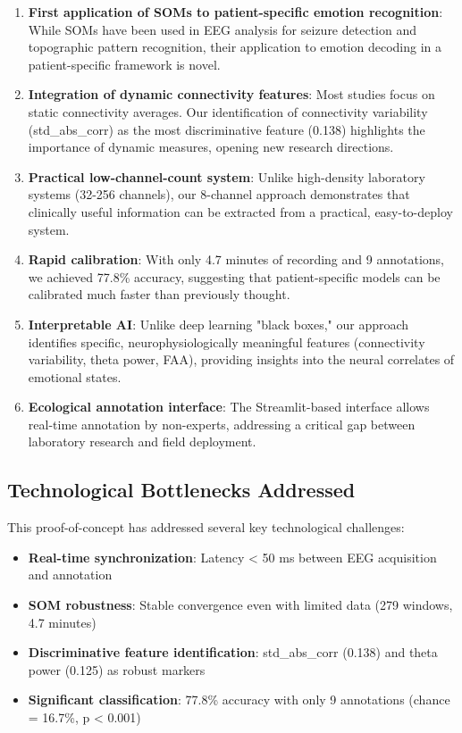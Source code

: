 \begin{enumerate}
    \item \textbf{First application of SOMs to patient-specific emotion recognition}: While SOMs have been used in EEG analysis for seizure detection and topographic pattern recognition, their application to emotion decoding in a patient-specific framework is novel.
    
    \item \textbf{Integration of dynamic connectivity features}: Most studies focus on static connectivity averages. Our identification of connectivity variability (std\_abs\_corr) as the most discriminative feature (0.138) highlights the importance of dynamic measures, opening new research directions.
    
    \item \textbf{Practical low-channel-count system}: Unlike high-density laboratory systems (32-256 channels), our 8-channel approach demonstrates that clinically useful information can be extracted from a practical, easy-to-deploy system.
    
    \item \textbf{Rapid calibration}: With only 4.7 minutes of recording and 9 annotations, we achieved 77.8\% accuracy, suggesting that patient-specific models can be calibrated much faster than previously thought.
    
    \item \textbf{Interpretable AI}: Unlike deep learning "black boxes," our approach identifies specific, neurophysiologically meaningful features (connectivity variability, theta power, FAA), providing insights into the neural correlates of emotional states.
    
    \item \textbf{Ecological annotation interface}: The Streamlit-based interface allows real-time annotation by non-experts, addressing a critical gap between laboratory research and field deployment.
\end{enumerate}

\subsection{Technological Bottlenecks Addressed}

This proof-of-concept has addressed several key technological challenges:

\begin{itemize}
    \item \textbf{Real-time synchronization}: Latency < 50 ms between EEG acquisition and annotation
    \item \textbf{SOM robustness}: Stable convergence even with limited data (279 windows, 4.7 minutes)
    \item \textbf{Discriminative feature identification}: std\_abs\_corr (0.138) and theta power (0.125) as robust markers
    \item \textbf{Significant classification}: 77.8\% accuracy with only 9 annotations (chance = 16.7\%, p < 0.001)
\end{itemize}

